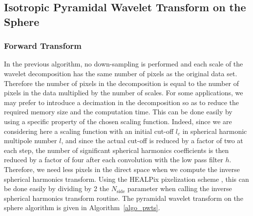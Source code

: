 
\subsection{Isotropic Pyramidal Wavelet Transform on the Sphere}

\subsubsection{Forward Transform}
In the previous algorithm, no down-sampling is
performed and each scale of the wavelet decomposition has the same number of pixels 
as the original data set. Therefore the number of pixels in the
decomposition is equal to the number of pixels in the data multiplied by the number of scales.
For some applications, we may prefer to introduce a decimation
in the decomposition so as to reduce the required memory size and the computation time.
This can be done easily by using a specific property of the chosen scaling function.
Indeed, since we are considering here a scaling function with an initial cut-off $l_c$ in spherical harmonic multipole number $l$, and since the actual cut-off is reduced by a factor of two at each step, the number 
of significant spherical harmonics coefficients is then reduced by a factor of four after each convolution with the low pass filter
$h$. Therefore, we need less pixels in the direct space when we compute the inverse 
spherical harmonics transform.  Using the HEALPix pixelization scheme \citep{pixel:healpix},  
this can be done easily by dividing by 2 the 
$N_{\mathrm{side}}$ parameter when calling the inverse spherical harmonics transform routine.
The pyramidal wavelet transform on the sphere algorithm is given in Algorithm~\ref{algo_pwts}.

